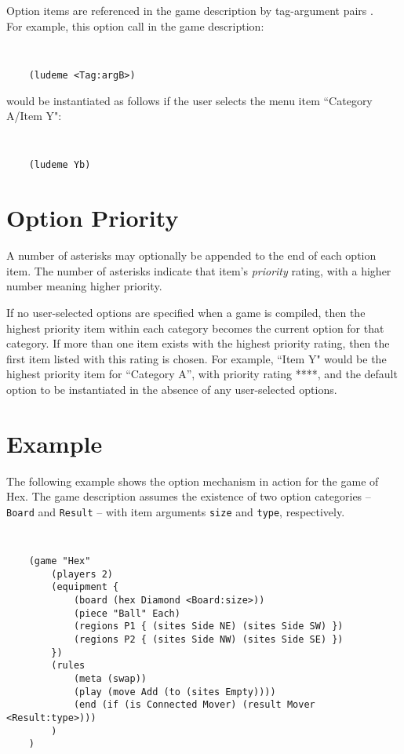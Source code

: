 \phantom{}
\noindent
Option items are referenced in the game description by tag-argument pairs {\tt <Tag:arg>}. \\
For example, this option call in the game description:

{\tt
\begin{verbatim}
    (ludeme <Tag:argB>)
\end{verbatim}
}

\noindent
would be instantiated as follows if the user selects the menu item ``Category A/Item Y":

{\tt
\begin{verbatim}
    (ludeme Yb)
\end{verbatim}
}


\section{Option Priority}

A number of asterisks may optionally be appended to the end of each option item. 
The number of asterisks indicate that item's {\it priority} rating, with a higher number meaning higher priority. 

If no user-selected options are specified when a game is compiled, then the highest priority item within each category becomes the current option for that category. 
If more than one item exists with the highest priority rating, then the first item listed with this rating is chosen. 
For example, ``Item Y" would be the highest priority item for ``Category A'', with priority rating ****, and the default option to be instantiated in the absence of any user-selected options.


\section{Example}

The following example shows the option mechanism in action for the game of Hex. 
The game description assumes the existence of two option categories -- {\tt Board} and {\tt Result} -- with item arguments {\tt size} and {\tt type}, respectively.  

{\tt
\begin{verbatim}
    (game "Hex"  
        (players 2)  
        (equipment { 
            (board (hex Diamond <Board:size>)) 
            (piece "Ball" Each)
            (regions P1 { (sites Side NE) (sites Side SW) })
            (regions P2 { (sites Side NW) (sites Side SE) })
        })  
        (rules 
            (meta (swap))
            (play (move Add (to (sites Empty)))) 
            (end (if (is Connected Mover) (result Mover <Result:type>))) 
        )
    )
\end{verbatim}
}

